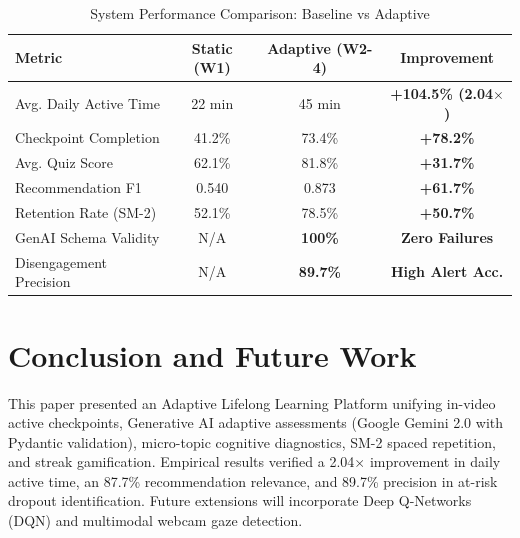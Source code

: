 \documentclass[conference]{IEEEtran}
\begin{document}
\begin{table}[htbp]
\caption{System Performance Comparison: Baseline vs Adaptive}
\centering
\begin{tabular}{@{}lccc@{}}
\toprule
\textbf{Metric} & \textbf{Static (W1)} & \textbf{Adaptive (W2-4)} & \textbf{Improvement} \\
\midrule
Avg. Daily Active Time & 22 min & 45 min & \textbf{+104.5\% (2.04$\times$)} \\
Checkpoint Completion & 41.2\% & 73.4\% & \textbf{+78.2\%} \\
Avg. Quiz Score & 62.1\% & 81.8\% & \textbf{+31.7\%} \\
Recommendation F1 & 0.540 & 0.873 & \textbf{+61.7\%} \\
Retention Rate (SM-2) & 52.1\% & 78.5\% & \textbf{+50.7\%} \\
GenAI Schema Validity & N/A & \textbf{100\%} & \textbf{Zero Failures} \\
Disengagement Precision & N/A & \textbf{89.7\%} & \textbf{High Alert Acc.} \\
\bottomrule
\end{tabular}
\label{tab:results}
\end{table}

\section{Conclusion and Future Work}
This paper presented an Adaptive Lifelong Learning Platform unifying in-video active checkpoints, Generative AI adaptive assessments (Google Gemini 2.0 with Pydantic validation), micro-topic cognitive diagnostics, SM-2 spaced repetition, and streak gamification. Empirical results verified a 2.04$\times$ improvement in daily active time, an 87.7\% recommendation relevance, and 89.7\% precision in at-risk dropout identification. Future extensions will incorporate Deep Q-Networks (DQN) and multimodal webcam gaze detection.
\end{document}
